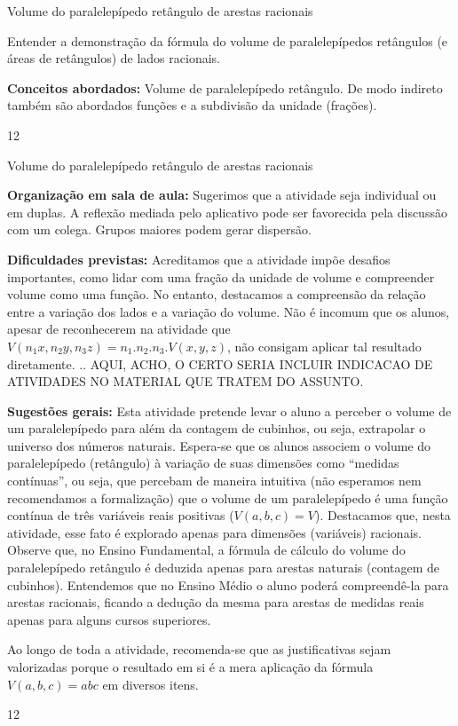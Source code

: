 \clearpage
\begin{objectives}{Volume do paralelepípedo retângulo de arestas racionais}
{
Entender a demonstração da fórmula do volume de paralelepípedos retângulos (e áreas de retângulos) de lados racionais.

\textbf{Conceitos abordados:}
Volume de paralelepípedo retângulo. De modo indireto também são abordados funções e a subdivisão da unidade (frações).
}{1}{2}
\end{objectives}
\begin{sugestions}{Volume do paralelepípedo retângulo de arestas racionais}
{
\textbf{Organização em sala de aula:}
Sugerimos que a atividade seja individual ou em duplas. A reflexão mediada pelo aplicativo pode ser favorecida pela discussão com um colega. Grupos maiores podem gerar dispersão.

\textbf{Dificuldades previstas:}
Acreditamos que a atividade impõe desafios importantes, como lidar com uma fração da unidade de volume e compreender volume como uma função. No entanto, destacamos a compreensão da relação entre a variação dos lados e a variação do volume. Não é incomum que os alunos, apesar de reconhecerem na atividade que  \(V(n_1 x, n_2 y, n_3 z) =  n_1.n_2.n_3. V(x, y, z)\), não consigam aplicar tal resultado diretamente.
.. AQUI, ACHO, O CERTO SERIA INCLUIR INDICACAO DE ATIVIDADES NO MATERIAL QUE TRATEM DO ASSUNTO.

\textbf{Sugestões gerais:}
Esta atividade pretende levar o aluno a perceber o volume de um paralelepípedo para além da contagem de cubinhos, ou seja, extrapolar o universo dos números naturais. Espera-se que os alunos associem o volume do paralelepípedo (retângulo) à variação de suas dimensões como “medidas contínuas”, ou seja, que percebam de maneira intuitiva (não esperamos nem recomendamos a formalização) que o volume de um paralelepípedo é uma função contínua de três variáveis reais positivas (\(V(a,b,c) = V\)). Destacamos que,  nesta atividade, esse fato é explorado apenas para dimensões (variáveis) racionais. Observe que, no Ensino Fundamental, a fórmula de cálculo do volume do paralelepípedo retângulo é deduzida apenas para arestas naturais (contagem de cubinhos). Entendemos que no Ensino Médio o aluno poderá compreendê-la para arestas racionais, ficando a dedução da mesma para arestas de medidas reais apenas para alguns cursos superiores.

Ao longo de toda a atividade, recomenda-se que as justificativas sejam valorizadas porque o resultado em si é a mera aplicação da fórmula \(V(a,b,c) = abc\) em diversos itens.
}{1}{2}
\end{sugestions}

